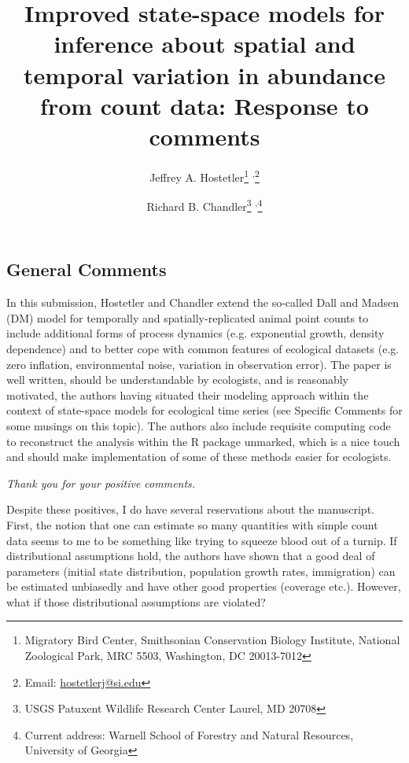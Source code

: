 \documentclass[12pt,english]{article}
\title{Improved state-space models for inference about 
spatial and temporal variation in abundance from count data: Response to comments}
\author{Jeffrey A. Hostetler\thanks{Migratory Bird Center, Smithsonian 
Conservation Biology Institute, National Zoological Park, MRC 5503, 
Washington, DC 20013-7012} \textsuperscript{,}\footnote{Email: \href{mailto:hostetlerj@si.edu}{hostetlerj@si.edu}}
   \and Richard B. Chandler\footnote{USGS Patuxent Wildlife Research Center 
        Laurel, MD 20708} \textsuperscript{,}\thanks{Current address: Warnell School of
     Forestry and Natural Resources, University of Georgia}        
}
\date{} %
\begin{document}
\maketitle
\vspace{-1cm}
\begin{spacing}{1.9}
\begin{flushleft}
\renewcommand*\thetable{R\arabic{table}}
\renewcommand*\thefigure{R\arabic{figure}}
\renewcommand*\theequation{R\arabic{equation}}

\section*{General Comments}
\label{sec:general}

In this submission, Hostetler and Chandler extend the so-called Dall and Madsen (DM) 
model for temporally and spatially-replicated animal point counts to include additional 
forms of process dynamics (e.g. exponential growth, density dependence) and to better 
cope with common features of ecological datasets (e.g. zero inflation, environmental noise, 
variation in observation error). The paper is well written, should be understandable by ecologists, 
and is reasonably motivated, the authors having situated their modeling approach within the 
context of state-space models for ecological time series (see Specific Comments for some 
musings on this topic). The authors also include requisite computing code to reconstruct the 
analysis within the R package unmarked, which is a nice touch and should make implementation 
of some of these methods easier for ecologists.

\vspace{0.5cm}
\textit{Thank you for your positive comments.}
\vspace{0.5cm}

Despite these positives, I do have several reservations about the manuscript. First, the notion that 
one can estimate so many quantities with simple count data seems to me to be something like trying 
to squeeze blood out of a turnip. If distributional assumptions hold, the authors have shown that a 
good deal of parameters (initial state distribution, population growth rates, immigration) can be 
estimated unbiasedly and have other good properties (coverage etc.). However, what if those 
distributional assumptions are violated?


\end{flushleft}
\end{spacing}
\end{document}
